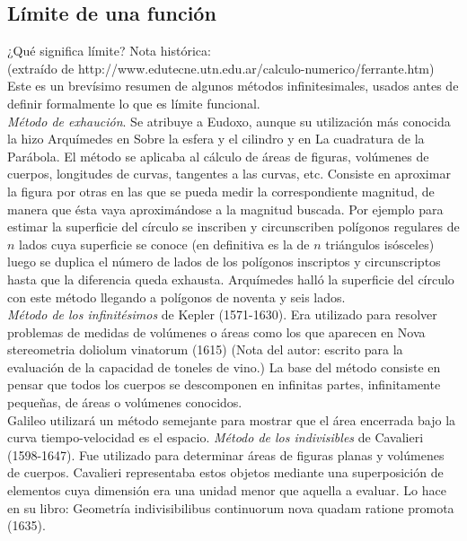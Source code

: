 \documentclass[10pt,twoside]{SelfArx} %
\begin{document}
\subsection{L\'imite de una funci\'on}



¿Qué significa límite?
Nota histórica:\\

(extraído de http://www.edutecne.utn.edu.ar/calculo-numerico/ferrante.htm)\\
Este es un brevísimo resumen de algunos métodos infinitesimales, usados antes de definir formalmente lo que es límite funcional.\\

	 \textsl{Método de exhaución}. Se atribuye a Eudoxo, aunque su utilización más conocida la hizo Arquímedes en Sobre la esfera y el cilindro y en La cuadratura de la Parábola. El método se aplicaba al cálculo de áreas de figuras, volúmenes de cuerpos, longitudes de curvas, tangentes a las curvas,
	etc. Consiste en aproximar la figura por otras en las que se pueda medir la correspondiente magnitud, de manera que ésta vaya aproximándose a la magnitud buscada. Por ejemplo para estimar la superficie del círculo se inscriben y circunscriben polígonos regulares de $ n $ lados cuya superficie se conoce (en definitiva es la de $ n $ triángulos isósceles) luego se duplica el número de lados de los polígonos inscriptos y circunscriptos hasta que la diferencia queda exhausta. Arquímedes halló la superficie del círculo con este método llegando a polígonos de noventa y seis lados.\\
	 \textsl{Método de los infinitésimos} de Kepler (1571-1630). Era utilizado para resolver problemas de medidas de volúmenes o áreas como los que aparecen en Nova stereometria doliolum vinatorum (1615) (Nota del autor: escrito para la evaluación de la capacidad de toneles de vino.) La base del método consiste en pensar que todos los cuerpos se descomponen en infinitas partes, infinitamente pequeñas, de áreas o volúmenes conocidos.\\
	Galileo utilizará un método semejante para mostrar que el área encerrada bajo la curva tiempo-velocidad es el espacio.
	\textsl{Método de los indivisibles} de Cavalieri (1598-1647). Fue utilizado para determinar áreas de figuras planas y volúmenes de cuerpos. Cavalieri representaba estos objetos mediante una superposición de elementos cuya dimensión era una unidad menor que aquella a evaluar. Lo hace en su libro: Geometr\'ia indivisibilibus continuorum nova quadam ratione promota (1635).\\
	
\end{document}
